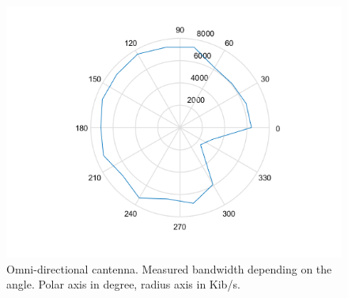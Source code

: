 \begin{figure}
\begin{center}
					\includegraphics[width=\figurewidth]{plots/polar_omni_b.png}
					\caption{Omni-directional cantenna. Measured bandwidth depending on the angle. Polar axis in degree, radius axis in Kib/s.}
					\label{img:ang:band:omni}
				\end{center}\end{figure}